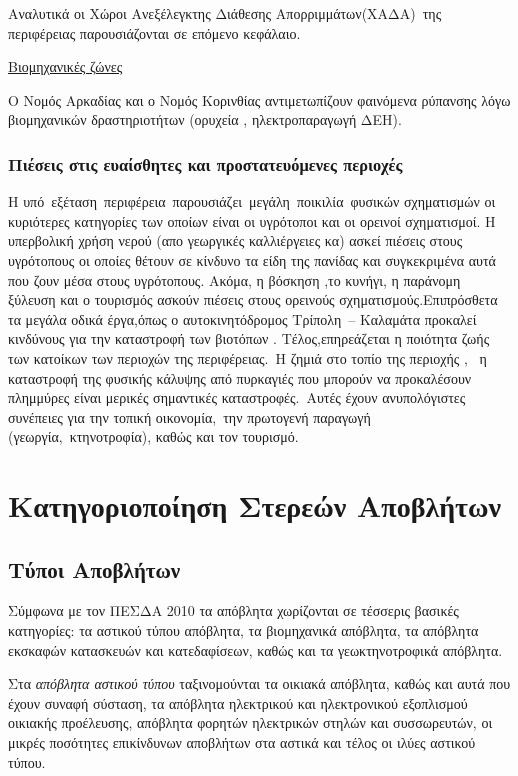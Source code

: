 \documentclass[12pt]{article}
\begin{document}
	Αναλυτικά οι Χώροι Ανεξέλεγκτης Διάθεσης Απορριμμάτων(ΧΑΔΑ) της περιφέρειας παρουσιάζονται σε επόμενο κεφάλαιο.
	
	\underline{Βιομηχανικές ζώνες}
	
	Ο Νομός Αρκαδίας και ο Νομός Κορινθίας αντιμετωπίζουν φαινόμενα ρύπανσης λόγω βιομηχανικών δραστηριοτήτων (ορυχεία , ηλεκτροπαραγωγή ΔΕΗ).
	
	\subsubsection{Πιέσεις στις ευαίσθητες και προστατευόμενες περιοχές}
	
	Η υπό εξέταση περιφέρεια παρουσιάζει μεγάλη ποικιλία φυσικών σχηματισμών οι κυριότερες κατηγορίες των οποίων είναι οι υγρότοποι και οι ορεινοί σχηματισμοί. Η υπερβολική χρήση νερού (απο γεωργικές καλλιέργειες κα) ασκεί πιέσεις στους υγρότοπους οι οποίες θέτουν σε κίνδυνο τα είδη της πανίδας και συγκεκριμένα αυτά που ζουν μέσα στους υγρότοπους. Ακόμα, η βόσκηση ,το κυνήγι, η παράνομη ξύλευση και ο τουρισμός ασκούν πιέσεις στους ορεινούς σχηματισμούς.Επιπρόσθετα τα μεγάλα οδικά έργα,όπως ο αυτοκινητόδρομος Τρίπολη – Καλαμάτα προκαλεί κινδύνους για την καταστροφή των βιοτόπων . Τέλος,επηρεάζεται η ποιότητα ζωής των κατοίκων των περιοχών της περιφέρειας. Η ζημιά στο τοπίο της περιοχής ,  η καταστροφή της φυσικής κάλυψης από πυρκαγιές που μπορούν να προκαλέσουν  πλημμύρες είναι μερικές σημαντικές καταστροφές. Αυτές έχουν ανυπολόγιστες συνέπειες για την τοπική οικονομία, την πρωτογενή παραγωγή (γεωργία, κτηνοτροφία), καθώς και τον τουρισμό.
	
	\section{Κατηγοριοποίηση Στερεών Αποβλήτων}
	
	\subsection{Τύποι Αποβλήτων}
	
	Σύμφωνα με τον ΠΕΣΔΑ 2010 τα απόβλητα χωρίζονται σε τέσσερις βασικές κατηγορίες: τα αστικού τύπου απόβλητα, τα βιομηχανικά απόβλητα, τα απόβλητα εκσκαφών κατασκευών και κατεδαφίσεων, καθώς και τα γεωκτηνοτροφικά απόβλητα.
	
	Στα \emph{απόβλητα αστικού τύπου} ταξινομούνται τα οικιακά απόβλητα, καθώς και αυτά που έχουν συναφή σύσταση, τα απόβλητα ηλεκτρικού και ηλεκτρονικού εξοπλισμού οικιακής προέλευσης, απόβλητα φορητών ηλεκτρικών στηλών και συσσωρευτών, οι μικρές ποσότητες επικίνδυνων αποβλήτων στα αστικά και τέλος οι ιλύες αστικού τύπου.
	
\end{document}
